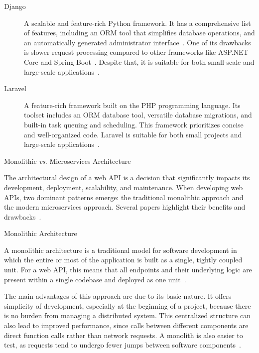 \documentclass[12pt, reqno]{amsbook}
\makeatletter
\def\section{\@startsection{section}{1}%
      \z@{.5\linespacing\@plus.7\linespacing}{.25\linespacing}%
      {\normalfont\bfseries\flushleft}}
\def\subsection{\@startsection{subsection}{2}%
      \z@{.5\linespacing\@plus.7\linespacing}{.25\linespacing}%
      {\normalfont\bfseries\flushleft}}
\theoremstyle{definition}
\theoremstyle{definition}
\numberwithin{section}{chapter}
\numberwithin{table}{chapter}
\numberwithin{figure}{chapter}
\makeatother
\begin{document}
\begin{description}
  \item [Django] A scalable and feature-rich Python framework. It has a comprehensive list of features, including an \ac{ORM} tool that simplifies database operations, and an automatically generated administrator interface~\cite{Mozilla, Zanevych2024, Chen2017}. One of its drawbacks is slower request processing compared to other frameworks like ASP.NET Core and Spring Boot~\cite{Haque2022, Choma2023}. Despite that, it is suitable for both small-scale and large-scale applications~\cite{Mozilla, Zanevych2024}.
  \item [Laravel] A feature-rich framework built on the PHP programming language. Its toolset includes an \ac{ORM} database tool, versatile database migrations, and built-in task queuing and scheduling. This framework prioritizes concise and well-organized code. Laravel is suitable for both small projects and large-scale applications~\cite{Mozilla, Madurapperuma2022, Nguyen2022}.
\end{description}

\section{Monolithic \textit{vs.} Microservices Architecture}
\label{Section:Monolithic_vs_Microservices_Architecture}

The architectural design of a web \ac{API} is a decision that significantly impacts its development, deployment, scalability, and maintenance. When developing web \acp{API}, two dominant patterns emerge: the traditional monolithic approach and the modern microservices approach. Several papers highlight their benefits and drawbacks~\cite{Huf2019, Taibi2018, Adrio2023, Moysiadis2022}.

\subsection{Monolithic Architecture}
\label{Subsection:Monolithic_Architecture}

A monolithic architecture is a traditional model for software development in which the entire or most of the application is built as a single, tightly coupled unit. For a web \ac{API}, this means that all endpoints and their underlying logic are present within a single codebase and deployed as one unit~\cite{Taibi2018, Adrio2023, Moysiadis2022, Figueira2024, Kenan2020, Yoo2025}.

The main advantages of this approach are due to its basic nature. It offers simplicity of development, especially at the beginning of a project, because there is no burden from managing a distributed system. This centralized structure can also lead to improved performance, since calls between different components are direct function calls rather than network requests. A monolith is also easier to test, as requests tend to undergo fewer jumps between software components~\cite{Blinowski2022, Taibi2018, Adrio2023, Moysiadis2022, Figueira2024, Kenan2020}.
\end{document}

